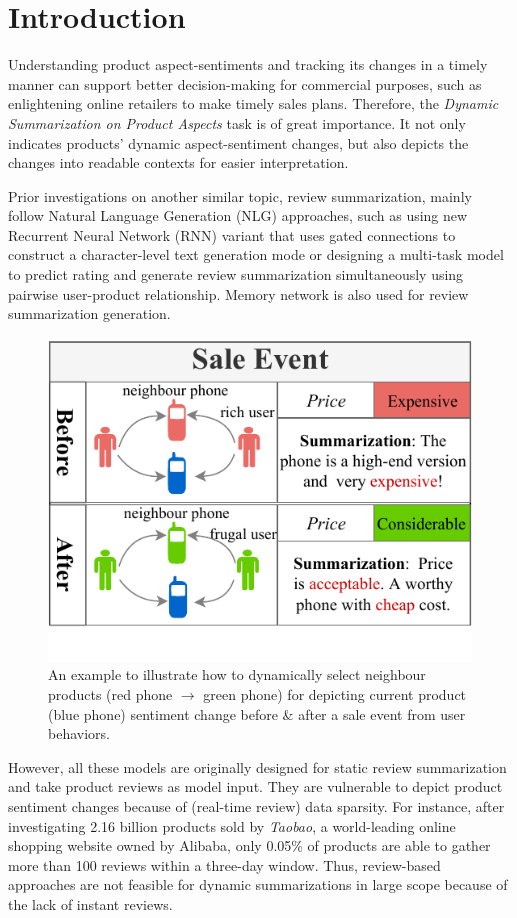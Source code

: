 \section{Introduction}

Understanding product aspect-sentiments and tracking its changes in a timely manner can support better decision-making for commercial purposes, such as enlightening online retailers to make timely sales plans. Therefore, the \textit{Dynamic Summarization on Product Aspects} task is of great importance. It not only indicates products' dynamic aspect-sentiment changes, but also depicts the changes into readable contexts for easier interpretation.

Prior investigations on another similar topic, review summarization, mainly follow Natural Language Generation (NLG) approaches, such as using new Recurrent Neural Network (RNN) variant that uses gated connections to construct a character-level text generation mode or designing a multi-task model to predict rating and generate review summarization simultaneously using pairwise user-product relationship. Memory network is also used for review summarization generation. 
\begin{figure}  
	\centering
	\includegraphics[width=0.8\columnwidth]{img/chapter5/example.pdf}
	\caption{An example to illustrate how to dynamically select neighbour products (red phone $\rightarrow$ green phone) for depicting current product (blue phone) sentiment change before \& after a sale event from user behaviors.}
	\label{fig:c5_example}
\end{figure}
However, all these models are originally designed for static review summarization and take product reviews as model input. They are vulnerable to depict product sentiment changes because of (real-time review) data sparsity. For instance, after investigating 2.16 billion products sold by \textit{Taobao}, a world-leading online shopping website owned by Alibaba, only 0.05\% of products are able to gather more than 100 reviews within a three-day window. Thus, review-based approaches are not feasible for dynamic summarizations in large scope because of the lack of instant reviews. 


